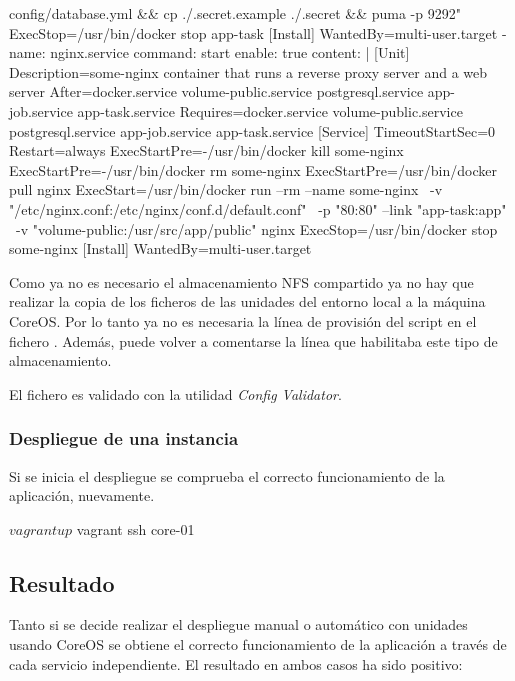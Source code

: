 \begin{codelisting}
\begin{code}
      config/database.yml && cp ./.secret.example ./.secret && puma -p 9292"
      ExecStop=/usr/bin/docker stop app-task
      [Install] 
      WantedBy=multi-user.target
  - name: nginx.service
    command: start
    enable: true
    content: |
      [Unit] 
      Description=some-nginx container that runs a reverse proxy server and 
                  a web server
      After=docker.service volume-public.service postgresql.service 
            app-job.service app-task.service
      Requires=docker.service volume-public.service postgresql.service 
               app-job.service app-task.service
      [Service] 
      TimeoutStartSec=0
      Restart=always 
      ExecStartPre=-/usr/bin/docker kill some-nginx 
      ExecStartPre=-/usr/bin/docker rm some-nginx
      ExecStartPre=/usr/bin/docker pull nginx 
      ExecStart=/usr/bin/docker run --rm --name some-nginx \
      -v "/etc/nginx.conf:/etc/nginx/conf.d/default.conf" \
      -p "80:80" --link "app-task:app" \
      -v "volume-public:/usr/src/app/public" nginx 
      ExecStop=/usr/bin/docker stop some-nginx
      [Install] 
      WantedBy=multi-user.target
  \end{code}
\end{codelisting}

Como ya no es necesario el almacenamiento NFS compartido ya no hay que realizar la copia de los ficheros de las unidades del entorno local a la máquina CoreOS. Por lo tanto ya no es necesaria la línea de provisión del script en el fichero . Además, puede volver a comentarse la línea que habilitaba este tipo de almacenamiento.

El fichero es validado con la utilidad \textit{Config Validator}. 

\subsubsection{Despliegue de una instancia}

Si se inicia el despliegue se comprueba el correcto funcionamiento de la aplicación, nuevamente.

\begin{code}
$ vagrant up
$ vagrant ssh core-01
\end{code}

\subsection{Resultado}
Tanto si se decide realizar el despliegue manual o automático con unidades usando CoreOS se obtiene el correcto funcionamiento de la aplicación a través de cada servicio independiente.
El resultado en ambos casos ha sido positivo:

